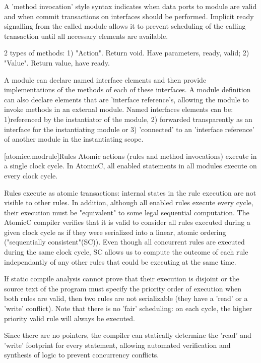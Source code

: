 A 'method invocation' style syntax indicates when data ports to module
are valid and when commit transactions on interfaces should be performed.
Implicit ready signalling from the called module allows it to prevent
scheduling of the calling transaction until all necessary elements are
available.

2 types of methods: 1) "Action".  Return void. Have parameters, ready, valid; 2) "Value". Return value, have ready.

A module can declare named interface elements and then provide implementations of
the methods of each of these interfaces.  A module definition can also declare
elements that are 'interface reference's, allowing the module to invoke methods
in an external module.
Named interfaces elements can be: 1)referenced by the instantiator of the module,
2) forwarded transparently as an interface for the instantiating module or 3) 'connected'
to an 'interface reference' of another module in the instantiating scope.

[atomicc.modrule]{Rules}
Atomic actions (rules and method invocations) execute in a single clock cycle.
In AtomicC, all enabled statements in all modules execute on every clock cycle.

Rules execute as atomic transactions: internal states in the rule
execution are not visible to other rules.  In addition, although all enabled
rules execute every cycle, their execution must be 
"equivalent" to some legal sequential computation.
\cite{Lamport:1979:MMC:1311099.1311750}
The AtomicC compiler verifies that it is valid to consider
all rules executed during a given clock cycle
as if they were serialized into a linear, atomic ordering ("sequentially consistent"(SC)).
Even though all concurrent rules are executed during the same clock cycle, SC allows us to compute the
outcome of each rule independantly of any other rules that could be executing at the same time.

If static compile analysis cannot prove that their execution is disjoint
or the source text of the program must specify the priority order of execution
when both rules are valid,
then two rules are not serializable (they have a 'read' or a 'write' conflict).
Note that there is no 'fair' scheduling: on each cycle, the higher priority valid rule will
always be executed.

Since there are no pointers, the compiler can statically determine the 'read' and 'write'
footprint for every statement, allowing automated verification and
synthesis of logic to prevent concurrency conflicts.

